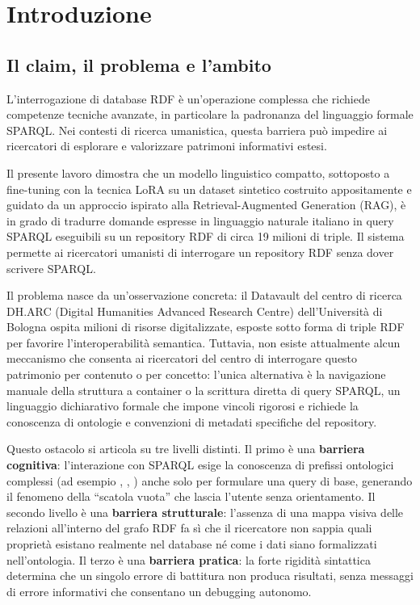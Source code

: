 \chapter{Introduzione}\label{chap:introduzione}

\section{Il claim, il problema e l'ambito}\label{sec:claim}

L'interrogazione di database RDF è un'operazione complessa che richiede competenze tecniche avanzate, in particolare la padronanza del linguaggio formale SPARQL\@. Nei contesti di ricerca umanistica, questa barriera può impedire ai ricercatori di esplorare e valorizzare patrimoni informativi estesi.

Il presente lavoro dimostra che un modello linguistico compatto, sottoposto a fine-tuning con la tecnica LoRA su un dataset sintetico costruito appositamente e guidato da un approccio ispirato alla Retrieval-Augmented Generation (RAG), è in grado di tradurre domande espresse in linguaggio naturale italiano in query SPARQL eseguibili su un repository RDF di circa 19 milioni di triple. Il sistema permette ai ricercatori umanisti di interrogare un repository RDF senza dover scrivere SPARQL\@.

Il problema nasce da un'osservazione concreta: il Datavault del centro di ricerca DH.ARC (Digital Humanities Advanced Research Centre) dell'Università di Bologna ospita milioni di risorse digitalizzate, esposte sotto forma di triple RDF per favorire l'interoperabilità semantica. Tuttavia, non esiste attualmente alcun meccanismo che consenta ai ricercatori del centro di interrogare questo patrimonio per contenuto o per concetto: l'unica alternativa è la navigazione manuale della struttura a container o la scrittura diretta di query SPARQL, un linguaggio dichiarativo formale che impone vincoli rigorosi e richiede la conoscenza di ontologie e convenzioni di metadati specifiche del repository\cite{Vas25}\cite{Vas24}.

Questo ostacolo si articola su tre livelli distinti. Il primo è una \textbf{barriera cognitiva}: l'interazione con SPARQL esige la conoscenza di prefissi ontologici complessi (ad esempio , , ) anche solo per formulare una query di base, generando il fenomeno della ``scatola vuota'' che lascia l'utente senza orientamento. Il secondo livello è una \textbf{barriera strutturale}: l'assenza di una mappa visiva delle relazioni all'interno del grafo RDF fa sì che il ricercatore non sappia quali proprietà esistano realmente nel database né come i dati siano formalizzati nell'ontologia. Il terzo è una \textbf{barriera pratica}: la forte rigidità sintattica determina che un singolo errore di battitura non produca risultati, senza messaggi di errore informativi che consentano un debugging autonomo.

